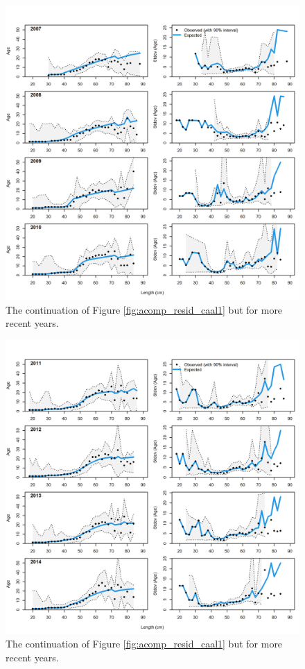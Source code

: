 \documentclass[11pt,
  english,
  a4paper,
]{article}
\begin{document}
\begin{figure}
\centering
\includegraphics[width=1\textwidth,height=1\textheight]{figs/comp_condAALfit_Andre_plotsflt8mkt0_page2.png}
\caption{The continuation of Figure \ref{fig:acomp_resid_caal1} but for more recent years. \label{fig:acomp_resid_caal2}}
\end{figure}

\tagmcend\tagstructend


\begin{figure}
\centering
\includegraphics[width=1\textwidth,height=1\textheight]{figs/comp_condAALfit_Andre_plotsflt8mkt0_page3.png}
\caption{The continuation of Figure \ref{fig:acomp_resid_caal1} but for more recent years. \label{fig:acomp_resid_caal3}}
\end{figure}
\end{document}
